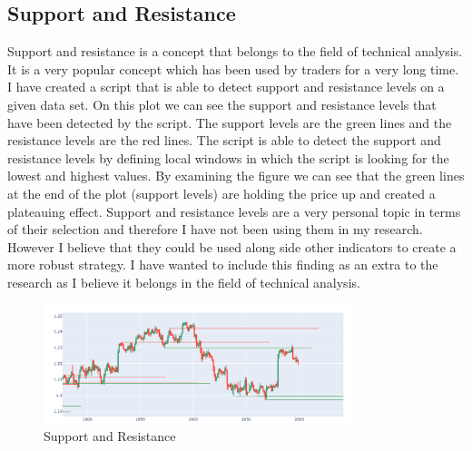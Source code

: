 \documentclass{imc-inf}
\begin{document}
	
	\begin{appendices} %
		\chapter{Support and Resistance}\label{appendix:support_resistance}
		Support and resistance is a concept that belongs to the field of technical analysis. It is a very popular concept which has been used by traders for a very long time. I have created a script that is able to detect support and resistance levels on a given data set.
		On this plot we can see the support and resistance levels that have been detected by the script. The support levels are the green lines and the resistance levels are the red lines. The script is able to detect the support and resistance levels by defining
		local windows in which the script is looking for the lowest and highest values. By examining the figure we can see that the green lines at the end  of the plot (support levels) are holding the price up and created a plateauing effect.
		Support and resistance levels are a very personal topic in terms of their selection and therefore I have not been using them in my research. However I believe that they could be used along side other indicators to create a more robust strategy.
		I have wanted to include this finding as an extra to the research as I believe it belongs in the field of technical analysis.
		\begin{figure}[h!]
			\centering
			\includegraphics[width=0.8\textwidth]{support_resistance.png}
			\caption{Support and Resistance}
			\label{fig:support_resistance}
		\end{figure}
		
	\end{appendices}
	
\end{document}
